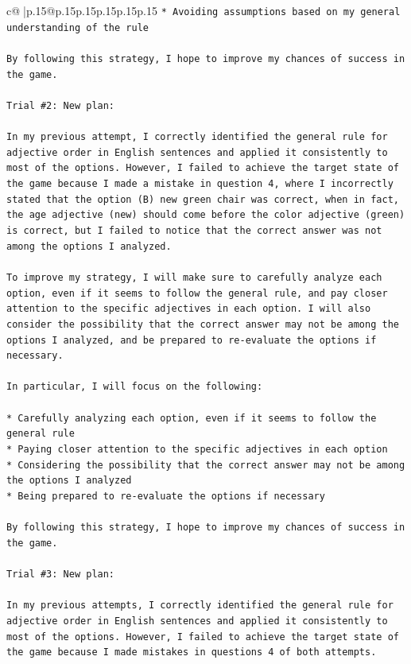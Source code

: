 \documentclass{article}
\begin{document}
{\begin{supertabular}{c@{$\;$}|p{.15\linewidth}@{}p{.15\linewidth}p{.15\linewidth}p{.15\linewidth}p{.15\linewidth}p{.15\linewidth}}
{{{\texttt{* Avoiding assumptions based on my general understanding of the rule} \\
\\ 
\texttt{By following this strategy, I hope to improve my chances of success in the game.} \\
\\ 
\texttt{Trial \#2: New plan: } \\
\\ 
\texttt{In my previous attempt, I correctly identified the general rule for adjective order in English sentences and applied it consistently to most of the options. However, I failed to achieve the target state of the game because I made a mistake in question 4, where I incorrectly stated that the option (B) new green chair was correct, when in fact, the age adjective (new) should come before the color adjective (green) is correct, but I failed to notice that the correct answer was not among the options I analyzed.} \\
\\ 
\texttt{To improve my strategy, I will make sure to carefully analyze each option, even if it seems to follow the general rule, and pay closer attention to the specific adjectives in each option. I will also consider the possibility that the correct answer may not be among the options I analyzed, and be prepared to re{-}evaluate the options if necessary.} \\
\\ 
\texttt{In particular, I will focus on the following:} \\
\\ 
\texttt{* Carefully analyzing each option, even if it seems to follow the general rule} \\
\texttt{* Paying closer attention to the specific adjectives in each option} \\
\texttt{* Considering the possibility that the correct answer may not be among the options I analyzed} \\
\texttt{* Being prepared to re{-}evaluate the options if necessary} \\
\\ 
\texttt{By following this strategy, I hope to improve my chances of success in the game.} \\
\\ 
\texttt{Trial \#3: New plan: } \\
\\ 
\texttt{In my previous attempts, I correctly identified the general rule for adjective order in English sentences and applied it consistently to most of the options. However, I failed to achieve the target state of the game because I made mistakes in questions 4 of both attempts. } \\
}}}
\end{supertabular}}
\end{document}
